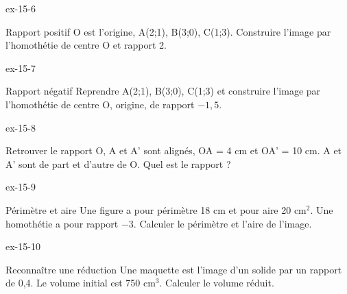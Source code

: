 \clearpage{}
\begin{blocLivre}{ex-15-6}\begin{exercice}[2]{Rapport positif}
O est l’origine, A(2;1), B(3;0), C(1;3). Construire l’image par l’homothétie de centre O et rapport 2.
\label{fig-ex-15-6}
\end{exercice}\end{blocLivre}
\begin{blocLivre}{ex-15-7}\begin{exercice}[2]{Rapport négatif}
Reprendre A(2;1), B(3;0), C(1;3) et construire l’image par l’homothétie de centre O, origine, de rapport $-1{,}5$.
\label{fig-ex-15-7}
\end{exercice}\end{blocLivre}
\begin{blocLivre}{ex-15-8}\begin{exercice}[2]{Retrouver le rapport}
O, A et A’ sont alignés, OA = 4 cm et OA’ = 10 cm. A et A’ sont de part et d’autre de O. Quel est le rapport ?
\label{fig-ex-15-8}
\end{exercice}\end{blocLivre}
\begin{blocLivre}{ex-15-9}\begin{exercice}[2]{Périmètre et aire}
Une figure a pour périmètre 18 cm et pour aire 20 cm$^2$. Une homothétie a pour rapport $-3$. Calculer le périmètre et l’aire de l’image.
\label{fig-ex-15-9}
\end{exercice}\end{blocLivre}
\begin{blocLivre}{ex-15-10}\begin{exercice}[2]{Reconnaître une réduction}
Une maquette est l’image d’un solide par un rapport de 0,4. Le volume initial est 750 cm$^3$. Calculer le volume réduit.
\label{fig-ex-15-10}
\end{exercice}\end{blocLivre}

